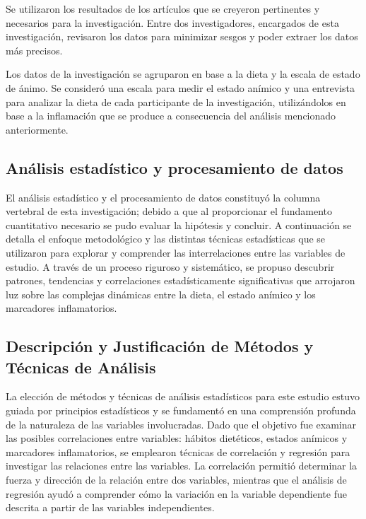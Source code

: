 \documentclass[jou]{apa7}
\begin{document}
	Se utilizaron los resultados de los artículos que se creyeron
	pertinentes y necesarios para la investigación. Entre dos
	investigadores, encargados de esta investigación, revisaron los datos
	para minimizar sesgos y poder extraer los datos más precisos.

	Los datos de la investigación se agruparon en base a la dieta y la
	escala de estado de ánimo. Se consideró una escala para medir el estado
	anímico y una entrevista para analizar la dieta de cada participante de
	la investigación, utilizándolos en base a la inflamación que se produce
	a consecuencia del análisis mencionado anteriormente.

	\subsection{Análisis estadístico y procesamiento de datos}

	El análisis estadístico y el procesamiento de datos constituyó la
	columna vertebral de esta investigación; debido a que al proporcionar el
	fundamento cuantitativo necesario se pudo evaluar la hipótesis y
	concluir. A continuación se detalla el enfoque metodológico y las
	distintas técnicas estadísticas que se utilizaron para explorar y comprender
	las interrelaciones entre las variables de estudio. A través de un
	proceso riguroso y sistemático, se propuso descubrir patrones,
	tendencias y correlaciones estadísticamente significativas que arrojaron
	luz sobre las complejas dinámicas entre la dieta, el estado anímico y
	los marcadores inflamatorios.

	\subsection{Descripción y Justificación de Métodos y Técnicas de Análisis}\label{descripciuxf3n-y-justificaciuxf3n-de-muxe9todos-y-tuxe9cnicas-de-anuxe1lisis}

	La elección de métodos y técnicas de análisis estadísticos para este
	estudio estuvo guiada por principios estadísticos y se fundamentó en una
	comprensión profunda de la naturaleza de las variables involucradas.
	Dado que el objetivo fue examinar las posibles correlaciones entre
	variables: hábitos dietéticos, estados anímicos y marcadores
	inflamatorios, se emplearon técnicas de correlación y regresión para
	investigar las relaciones entre las variables. La correlación permitió
	determinar la fuerza y dirección de la relación entre dos
	variables, mientras que el análisis de regresión ayudó a
	comprender cómo la variación en la variable dependiente fue descrita a
	partir de las variables independientes.\\
\end{document}
